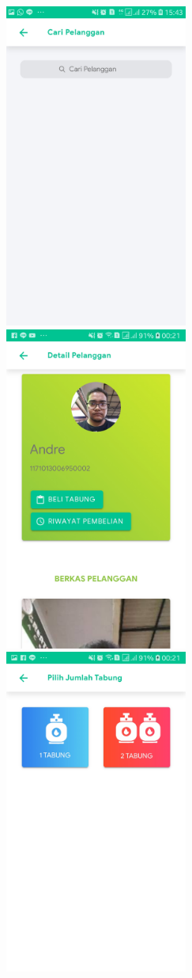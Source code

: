 	\begin{figure}[H]
		\center
		\includegraphics [width = 6cm]{gambar/android/cari-pelanggan}
		\vspace{1cm}
		\hspace{1cm}
		\includegraphics [width = 6cm]{gambar/android/detail-pelanggan}
		\includegraphics [width = 6cm]{gambar/android/pilih-tabung}

\end{figure}
